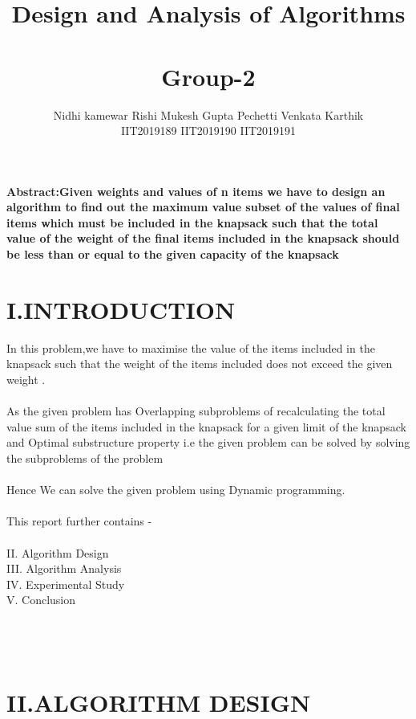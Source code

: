 \documentclass[twocolumn]{article}
\title{\vspace{-2cm} \textbf{{\myfont Design and Analysis of Algorithms}} \\
\\Group-2
}
\author{Nidhi kamewar   \hspace{10ex}Rishi Mukesh Gupta \hspace{6ex}   Pechetti Venkata Karthik\\    
\hspace{4ex}  IIT2019189     \hspace{14ex}           IIT2019190       \hspace{18ex}           IIT2019191   \hspace{9ex}  
   


}
\date{}
\begin{document}
\maketitle
\noindent
\textbf{
Abstract:Given weights and values of n items we have to design an algorithm to find out the maximum value subset of the values of final items which must be included in the knapsack such that the total value of the weight of the final items included in the knapsack should be less than or equal to  the given capacity of the knapsack}

\section*{I.INTRODUCTION}

In this problem,we have to maximise the value of the items included in the knapsack such that the weight of the items included does not exceed the given weight .\\
\\
As the given problem has Overlapping subproblems of recalculating the total value sum of the items included in the knapsack for a given limit of the knapsack and Optimal substructure property i.e the given problem can be solved by  solving the subproblems of the problem
\\
\\
Hence We can solve the given problem using Dynamic programming.
\\
\noindent\\
This report further contains -\\
\\
II. Algorithm Design \\
III. Algorithm Analysis\\
IV. Experimental Study\\
V. Conclusion\\
\\
\\
\\
\section*{II.ALGORITHM DESIGN
}
\end{document}
